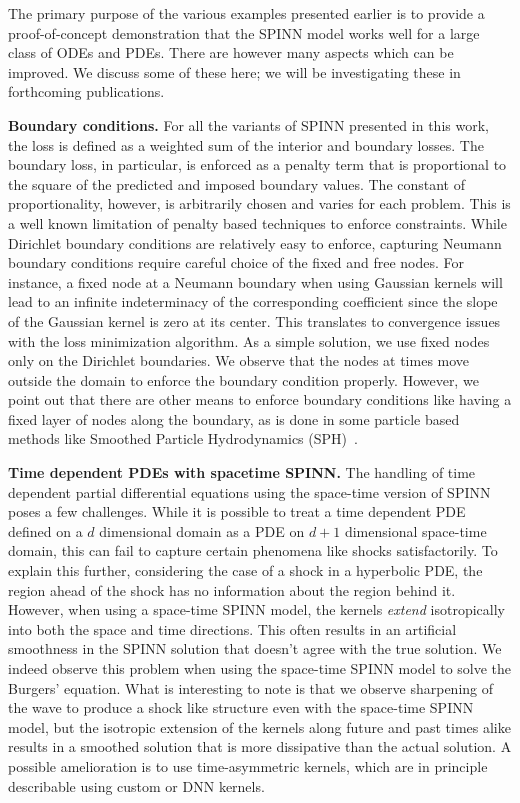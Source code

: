 \documentclass[12pt]{article}
\begin{document}
The primary purpose of the various examples presented earlier is to provide a proof-of-concept demonstration that the SPINN model works well for a large class of ODEs and PDEs. There are however many aspects which can be improved. We discuss some of these here; we will be investigating these in forthcoming publications.

\textbf{Boundary conditions.} For all the variants of SPINN presented in this work, the loss is defined as a weighted sum of the interior and boundary losses. The boundary loss, in particular, is enforced as a penalty term that is proportional to the square of the predicted and imposed boundary values. The constant of proportionality, however, is arbitrarily chosen and varies for each problem. This is a well known limitation of penalty based techniques to enforce constraints. While Dirichlet boundary conditions are relatively easy to enforce, capturing Neumann boundary conditions require careful choice of the fixed and free nodes. For instance, a fixed node at a Neumann boundary when using Gaussian kernels will lead to an infinite indeterminacy of the corresponding coefficient since the slope of the Gaussian kernel is zero at its center. This translates to convergence issues with the loss minimization algorithm. As a simple solution, we use fixed nodes only on the Dirichlet boundaries. We observe that the nodes at times move outside the domain to enforce the boundary condition properly. However, we point out that there are other means to enforce boundary conditions like having a fixed layer of nodes along the boundary, as is done in some particle based methods like Smoothed Particle Hydrodynamics (SPH)~\cite{ye2019sph}.

\textbf{Time dependent PDEs with spacetime SPINN.} The handling of time dependent partial differential equations using the space-time version of SPINN poses a few challenges. While it is possible to treat a time dependent PDE defined on a $d$ dimensional domain as a PDE on $d + 1$ dimensional space-time domain, this can fail to capture certain phenomena like shocks satisfactorily. To explain this further, considering the case of a shock in a hyperbolic PDE, the region ahead of the shock has no information about the region behind it. However, when using a space-time SPINN model, the kernels \emph{extend} isotropically into both the space and time directions. This often results in an artificial smoothness in the SPINN solution that doesn't agree with the true solution. We indeed observe this problem when using the space-time SPINN model to solve the Burgers' equation. What is interesting to note is that we observe sharpening of the wave to produce a shock like structure even with the space-time SPINN model, but the isotropic extension of the kernels along future and past times alike results in a smoothed solution that is more dissipative than the actual solution. A possible amelioration is to use time-asymmetric kernels, which are in principle describable using custom or DNN kernels.
\end{document}
